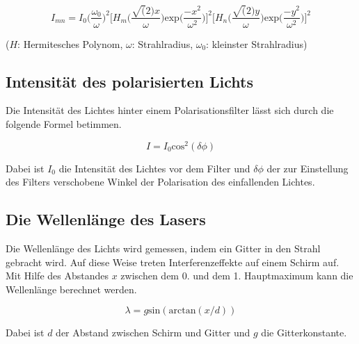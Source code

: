 \begin{equation}
  I_{mn} = I_0 \biggl(\frac{\omega_0}{\omega}\biggr)^2 \biggl\lbrack H_m \biggl( \frac{\sqrt(2)x}{\omega} \biggr) \text{exp} \biggl( \frac{-x^2}{\omega^2} \biggr) \biggr\rbrack^2 \biggl\lbrack H_n \biggl( \frac{\sqrt(2)y}{\omega} \biggr) \text{exp} \biggl( \frac{-y^2}{\omega^2} \biggr) \biggr\rbrack^2
\end{equation}

($H$: Hermitesches Polynom, $\omega$: Strahlradius, $\omega_0$: kleinster Strahlradius)

\subsection{Intensität des polarisierten Lichts}

Die Intensität des Lichtes hinter einem Polarisationsfilter lässt sich durch die folgende Formel betimmen.

\begin{equation}
  I = I_0 \text{cos}^2(\delta\phi)
\end{equation}

Dabei ist $I_0$ die Intensität des Lichtes vor dem Filter und $\delta\phi$ der zur Einstellung des Filters verschobene Winkel
der Polarisation des einfallenden Lichtes.

\subsection{Die Wellenlänge des Lasers}

Die Wellenlänge des Lichts wird gemessen, indem ein Gitter in den Strahl gebracht wird. Auf diese Weise treten Interferenzeffekte
auf einem Schirm auf. Mit Hilfe des Abstandes $x$ zwischen dem 0. und dem 1. Hauptmaximum kann die Wellenlänge berechnet werden.

\begin{equation}
  \lambda = g \text{sin}(\text{arctan}(x/d))
\end{equation}

Dabei ist $d$ der Abstand zwischen Schirm und Gitter und $g$ die Gitterkonstante.
